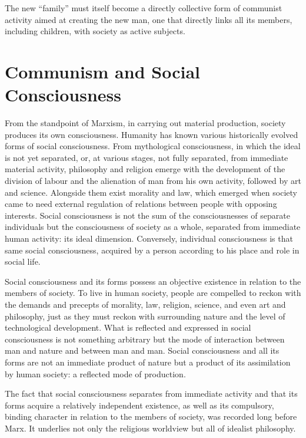 \documentclass[12pt,a4paper,openany]{book}
\begin{document}
The new “family” must itself become a directly collective form of communist activity aimed at creating the new man, one that directly links all its members, including children, with society as active subjects.
\ifSubfilesClassLoaded{\setcounter{page}{54}}{}
\section{Communism and Social Consciousness}
\label{sec:10_communism_consciousness}

From the standpoint of Marxism, in carrying out material production, society produces its own consciousness. Humanity has known various historically evolved forms of social consciousness. From mythological consciousness, in which the ideal is not yet separated, or, at various stages, not fully separated, from immediate material activity, philosophy and religion emerge with the development of the division of labour and the alienation of man from his own activity, followed by art and science. Alongside them exist morality and law, which emerged when society came to need external regulation of relations between people with opposing interests. Social consciousness is not the sum of the consciousnesses of separate individuals but the consciousness of society as a whole, separated from immediate human activity: its ideal dimension. Conversely, individual consciousness is that same social consciousness, acquired by a person according to his place and role in social life.

Social consciousness and its forms possess an objective existence in relation to the members of society. To live in human society, people are compelled to reckon with the demands and precepts of morality, law, religion, science, and even art and philosophy, just as they must reckon with surrounding nature and the level of technological development. What is reflected and expressed in social consciousness is not something arbitrary but the mode of interaction between man and nature and between man and man. Social consciousness and all its forms are not an immediate product of nature but a product of its assimilation by human society: a reflected mode of production.

The fact that social consciousness separates from immediate activity and that its forms acquire a relatively independent existence, as well as its compulsory, binding character in relation to the members of society, was recorded long before Marx. It underlies not only the religious worldview but all of idealist philosophy.
\end{document}
